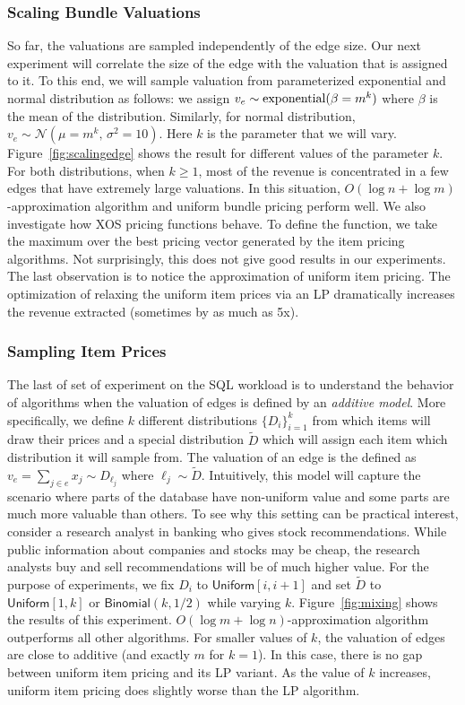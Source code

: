 \subsubsection{Scaling Bundle Valuations} So far, the valuations are sampled independently of the edge size. Our next experiment will correlate the size of the edge with the valuation that is assigned to it. To this end, we will sample valuation from parameterized exponential and normal distribution as follows: we assign $v_e \sim {\rm exponential}(\beta = m^k)$ where $\beta$ is the mean of the distribution. Similarly, for normal distribution, $v_e \sim \mathcal{N}(\mu = m^k,\, \sigma^2 = 10)$. Here $k$ is the parameter that we will vary. Figure~\ref{fig:scalingedge} shows the result for different values of the parameter $k$. For both distributions, when $k \geq 1$, most of the revenue is concentrated in a few edges that have extremely large valuations. In this situation, $O(\log n + \log m)$-approximation algorithm and uniform bundle pricing perform well. We also investigate how XOS pricing functions behave. To define the function, we take the maximum over the best pricing vector generated by the item pricing algorithms. Not surprisingly, this does not give good results in our experiments. The last observation is to notice the approximation of uniform item pricing. The optimization of relaxing the uniform item prices via an LP dramatically increases the revenue extracted (sometimes by as much as 5x).

\subsubsection{Sampling Item Prices} The last of set of experiment on the SQL workload is to understand the behavior of algorithms when the valuation of edges is defined by an \emph{additive model}. More specifically, we define $k$ different distributions $\{D_i\}_{i=1}^{k}$ from which items will draw their prices and a special distribution $\tilde{D}$ which will assign each item which distribution it will sample from. The valuation of an edge is the defined as $v_e = \sum_{j \in e} x_j \sim D_{\ell_j}$ where $\ell_j \sim \tilde{D}$. Intuitively, this model will capture the scenario where parts of the database have non-uniform value and some parts are much more valuable than others. To see why this setting can be practical interest, consider a research analyst in banking who gives stock recommendations. While public information about companies and stocks may be cheap, the research analysts buy and sell recommendations will be of much higher value. For the purpose of experiments, we fix $D_i$ to $\textsf{Uniform}[i, i+1]$ and set $\tilde{D}$ to $\textsf{Uniform}[1, k]$ or $\textsf{Binomial}(k, 1/2)$ while varying $k$. Figure~\ref{fig:mixing} shows the results of this experiment. $O(\log m + \log n)$-approximation algorithm outperforms all other algorithms. For smaller values of $k$, the valuation of edges are close to additive (and exactly $m$ for $k=1$). In this case, there is no gap between uniform item pricing and its LP variant. As  the value of $k$ increases, uniform item pricing does slightly worse than the LP algorithm.


